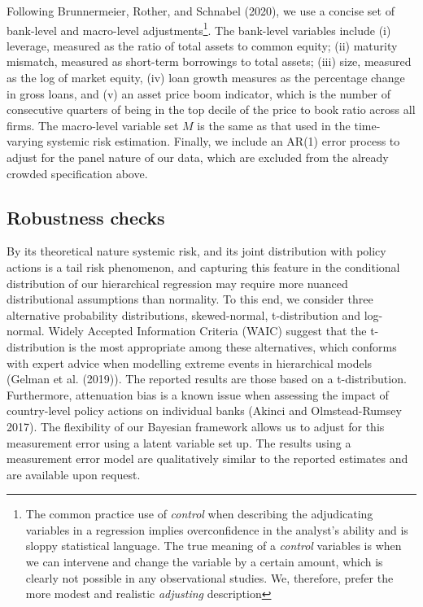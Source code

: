 \documentclass[
  10pt,
]{article}
\begin{document}
Following Brunnermeier, Rother, and Schnabel (2020), we use a concise
set of bank-level and macro-level adjustments\footnote{The common
  practice use of \emph{control} when describing the adjudicating
  variables in a regression implies overconfidence in the analyst's
  ability and is sloppy statistical language. The true meaning of a
  \emph{control} variables is when we can intervene and change the
  variable by a certain amount, which is clearly not possible in any
  observational studies. We, therefore, prefer the more modest and
  realistic \emph{adjusting} description}. The bank-level variables
include (i) leverage, measured as the ratio of total assets to common
equity; (ii) maturity mismatch, measured as short-term borrowings to
total assets; (iii) size, measured as the log of market equity, (iv)
loan growth measures as the percentage change in gross loans, and (v) an
asset price boom indicator, which is the number of consecutive quarters
of being in the top decile of the price to book ratio across all firms.
The macro-level variable set \(M\) is the same as that used in the
time-varying systemic risk estimation. Finally, we include an AR(1)
error process to adjust for the panel nature of our data, which are
excluded from the already crowded specification above.

\hypertarget{robustness-checks}{%
\subsection{Robustness checks}\label{robustness-checks}}

By its theoretical nature systemic risk, and its joint distribution with
policy actions is a tail risk phenomenon, and capturing this feature in
the conditional distribution of our hierarchical regression may require
more nuanced distributional assumptions than normality. To this end, we
consider three alternative probability distributions, skewed-normal,
t-distribution and log-normal. Widely Accepted Information Criteria
(WAIC) suggest that the t-distribution is the most appropriate among
these alternatives, which conforms with expert advice when modelling
extreme events in hierarchical models (Gelman et al. (2019)). The
reported results are those based on a t-distribution. Furthermore,
attenuation bias is a known issue when assessing the impact of
country-level policy actions on individual banks (Akinci and
Olmstead-Rumsey 2017). The flexibility of our Bayesian framework allows
us to adjust for this measurement error using a latent variable set up.
The results using a measurement error model are qualitatively similar to
the reported estimates and are available upon request.
\end{document}
